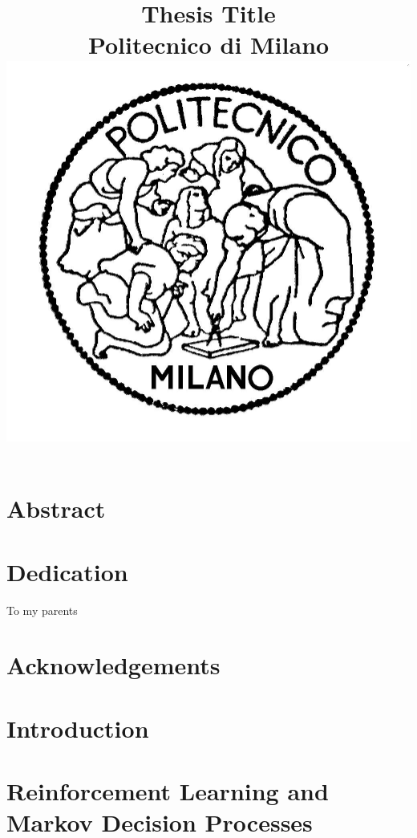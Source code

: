 \documentclass[11pt]{report}
\begin{document}
\title{
	{Thesis Title}\\
	{\large Politecnico di Milano}\\
	{\includegraphics{Logo-pol.jpg}}
}
\chapter*{Abstract}

\chapter*{Dedication}
To my parents

\chapter*{Acknowledgements}
\tableofcontents

\listoffigures

\listoftables

\listofalgorithms

\chapter{Introduction}

\chapter{Reinforcement Learning and Markov Decision Processes} \label{chap:chapter2}
 
\end{document}
